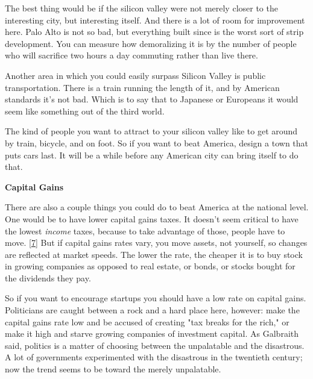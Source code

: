 The best thing
                  would be if the silicon valley were not merely closer to the
                  interesting city, but interesting itself. And there is a lot
                  of room for improvement here. Palo Alto is not so bad, but
                  everything built since is the worst sort of strip development.
                  You can measure how demoralizing it is by the number of people
                  who will sacrifice two hours a day commuting rather than live
                  there.

Another area in which you could easily
                  surpass Silicon Valley is public transportation. There is a
                  train running the length of it, and by American standards it's
                  not bad. Which is to say that to Japanese or Europeans it
                  would seem like something out of the third world.

The
                  kind of people you want to attract to your silicon valley like
                  to get around by train, bicycle, and on foot. So if you want
                  to beat America, design a town that puts cars last. It will be
                  a while before any American city can bring itself to do
                  that.

\textbf{Capital Gains}

There are
                  also a couple things you could do to beat America at the
                  national level. One would be to have lower capital gains
                  taxes. It doesn't seem critical to have the lowest
                  \emph{income} taxes, because to take advantage of those,
                  people have to move.
                  [\href{\#f7n}{7}]
                  But if capital gains rates vary, you move assets, not
                  yourself, so changes are reflected at market speeds. The lower
                  the rate, the cheaper it is to buy stock in growing companies
                  as opposed to real estate, or bonds, or stocks bought for the
                  dividends they pay.

So if you want to encourage
                  startups you should have a low rate on capital gains.
                  Politicians are caught between a rock and a hard place here,
                  however: make the capital gains rate low and be accused of
                  creating "tax breaks for the rich," or make it high and starve
                  growing companies of investment capital. As Galbraith said,
                  politics is a matter of choosing between the unpalatable and
                  the disastrous. A lot of governments experimented with the
                  disastrous in the twentieth century; now the trend seems to be
                  toward the merely unpalatable.

